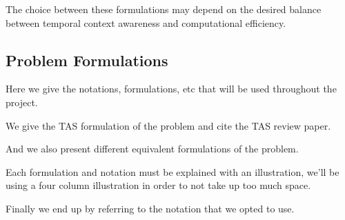 The choice between these formulations may depend on the desired balance between temporal context awareness and computational efficiency.







\subsection{Problem Formulations}

Here we give the notations, formulations, etc that will be used throughout the project.

We give the TAS formulation of the problem and cite the TAS review paper.

And we also present different equivalent formulations of the problem.

Each formulation and notation must be explained with an illustration, we'll be using a four column illustration in order to not take up too much space.

Finally we end up by referring to the notation that we opted to use.

